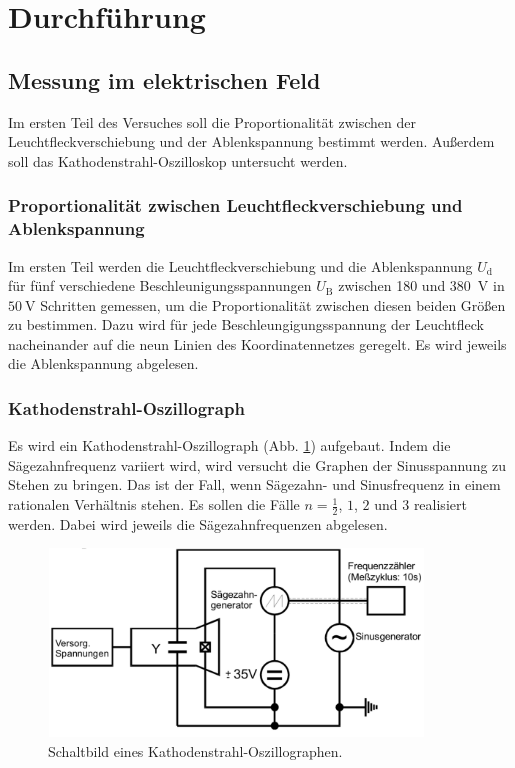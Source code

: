 \section{Durchführung}
\label{sec:Durchführung}

\subsection{Messung im elektrischen Feld}
Im ersten Teil des Versuches soll die Proportionalität zwischen
der Leuchtfleckverschiebung und der Ablenkspannung bestimmt werden.
Außerdem soll das Kathodenstrahl-Oszilloskop untersucht werden.

\subsubsection{Proportionalität zwischen Leuchtfleckverschiebung und Ablenkspannung}
Im ersten Teil werden die Leuchtfleckverschiebung und die 
Ablenkspannung $U_\text{d}$ für fünf verschiedene 
Beschleunigungsspannungen $U_\text{B}$ zwischen \num{180} und 
\SI{380}{\volt} in $\SI{50}{\volt}$ Schritten gemessen,
um die Proportionalität zwischen diesen beiden Größen zu
bestimmen. Dazu wird für jede Beschleungigungsspannung der
Leuchtfleck nacheinander auf die neun Linien des
Koordinatennetzes geregelt. Es wird jeweils die Ablenkspannung
abgelesen.

\subsubsection{Kathodenstrahl-Oszillograph}
Es wird ein Kathodenstrahl-Oszillograph (Abb. \ref{fig:oszillograph})
aufgebaut. Indem die Sägezahnfrequenz variiert wird,
wird versucht die Graphen der Sinusspannung zu Stehen zu bringen.
Das ist der Fall, wenn Sägezahn- und 
Sinusfrequenz in einem rationalen Verhältnis stehen. Es sollen 
die Fälle $n = \frac{1}{2}$, $\num{1}$, $\num{2}$ und $\num{3}$ realisiert 
werden. Dabei wird jeweils die Sägezahnfrequenzen abgelesen. 
\begin{figure}
    \centering
    \includegraphics[width=10cm, height=5cm]{build/V501_b.png}
    \caption{Schaltbild eines Kathodenstrahl-Oszillographen. \cite{V501}}
    \label{fig:oszillograph}
\end{figure}

